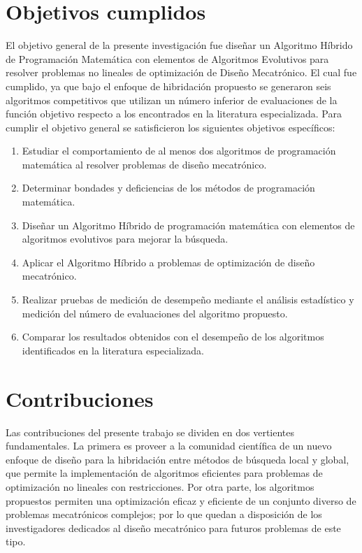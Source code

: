 	 \section{Objetivos cumplidos}
	  El objetivo general de la presente investigación fue diseñar un Algoritmo Híbrido de Programación Matemática con elementos de Algoritmos Evolutivos  para resolver problemas no lineales de optimización de  Diseño Mecatrónico. El cual fue cumplido, ya que bajo el enfoque de hibridación propuesto se generaron seis algoritmos competitivos que utilizan un número inferior de evaluaciones de la función objetivo respecto a los encontrados en la literatura especializada. Para cumplir el objetivo general se satisficieron los siguientes objetivos específicos:
	 \begin{enumerate}
	 	\item	Estudiar el comportamiento de al menos dos algoritmos de programación matemática al resolver problemas de diseño mecatrónico.
	 	\item	Determinar bondades y deficiencias de los métodos de programación matemática.
	 	\item	Diseñar un Algoritmo Híbrido de programación matemática con elementos de algoritmos evolutivos para mejorar la búsqueda.
	 	\item	Aplicar el Algoritmo Híbrido a problemas de optimización de diseño mecatrónico.
	 	\item	Realizar pruebas de medición de desempeño mediante el análisis estadístico y medición del número de evaluaciones del algoritmo propuesto.
	 	\item	Comparar los resultados obtenidos con el desempeño de los algoritmos identificados en la literatura especializada.
	 \end{enumerate}
	 
 \section{Contribuciones}
 Las contribuciones del presente trabajo se dividen en dos vertientes fundamentales. La primera es proveer a la comunidad científica de un nuevo enfoque de diseño para la hibridación entre métodos de búsqueda local y global, que permite la implementación de algoritmos eficientes para problemas de optimización no lineales con restricciones. Por otra parte, los algoritmos propuestos permiten una optimización eficaz y eficiente de un conjunto diverso de problemas mecatrónicos complejos; por lo que quedan a disposición de los investigadores dedicados al diseño mecatrónico para futuros problemas de este tipo. 
